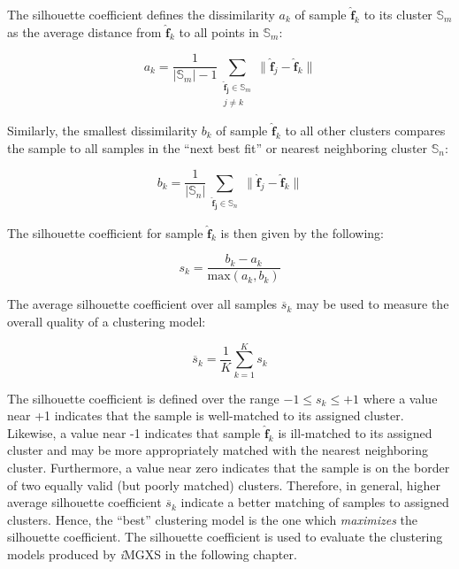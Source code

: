 The silhouette coefficient defines the dissimilarity $a_{k}$ of sample $\boldsymbol{\hat{f}}_{k}$ to its cluster $\mathbb{S}_{m}$ as the average distance from $\boldsymbol{\hat{f}}_{k}$ to all points in $\mathbb{S}_{m}$:

\begin{equation}
\label{eqn:chap10-silhouette-a}
a_{k} = \frac{1}{|\mathbb{S}_{m}|-1} \displaystyle\sum\limits_{\substack{\boldsymbol{\hat{f}_{j}} \in \mathbb{S}_{m}\\ j \ne k}} \|\boldsymbol{\hat{f}}_{j} - \boldsymbol{\hat{f}}_{k}\|
\end{equation}

\noindent Similarly, the smallest dissimilarity $b_{k}$ of sample $\boldsymbol{\hat{f}}_{k}$ to all other clusters compares the sample to all samples in the ``next best fit'' or nearest neighboring cluster $\mathbb{S}_{n}$:

\begin{equation}
\label{eqn:chap10-silhouette-b}
b_{k} = \frac{1}{|\mathbb{S}_{n}|} \displaystyle\sum\limits_{\substack{\boldsymbol{\hat{f}_{j}} \in \mathbb{S}_{n}}} \|\boldsymbol{\hat{f}}_{j} - \boldsymbol{\hat{f}}_{k}\|
\end{equation}

\noindent The silhouette coefficient for sample $\boldsymbol{\hat{f}}_{k}$ is then given by the following:

\begin{equation}
\label{eqn:chap10-silhouette}
s_{k} = \frac{b_{k}-a_{k}}{\textrm{max}(a_{k},b_{k})}
\end{equation}

\noindent The average silhouette coefficient over all samples $\overline{s}_{k}$ may be used to measure the overall quality of a clustering model:

\begin{equation}
\label{eqn:chap10-silhouette-mean}
\overline{s}_{k} = \frac{1}{K} \displaystyle\sum\limits_{k=1}^{K} s_{k}
\end{equation}

The silhouette coefficient is defined over the range $-1 \le s_{k} \le +1$ where a value near +1 indicates that the sample is well-matched to its assigned cluster. Likewise, a value near -1 indicates that sample $\boldsymbol{\hat{f}}_{k}$ is ill-matched to its assigned cluster and may be more appropriately matched with the nearest neighboring cluster. Furthermore, a value near zero indicates that the sample is on the border of two equally valid (but poorly matched) clusters. Therefore, in general, higher average silhouette coefficient $\overline{s}_{k}$ indicate a better matching of samples to assigned clusters. Hence, the ``best'' clustering model is the one which \textit{maximizes} the silhouette coefficient. The silhouette coefficient is used to evaluate the clustering models produced by \textit{i}\ac{MGXS} in the following chapter.

